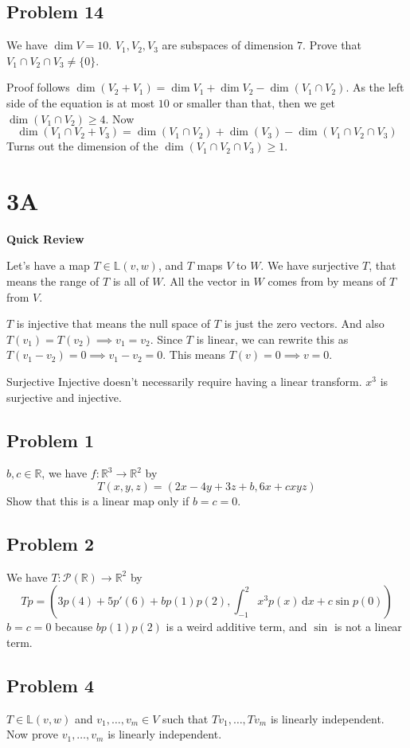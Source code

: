 \documentclass[letter]{article}
\begin{document}
\subsection{Problem 14} 
We have $\dim V = 10$. $V_1,V_2, V_3$ are subspaces of dimension $ 7$. Prove that $V_1 \cap V_2 \cap  V_3 \neq \{0\} $.

Proof follows $\dim(V_2 + V_1) = \dim V_1 + \dim V_2 - \dim(V_1 \cap  V_2)$. As the left side of the equation is at most $10$ or smaller than that, then we get $\dim (V_1 \cap V_2) \ge 4$. Now
\[
\dim (V_1 \cap  V_2 + V_3) = \dim(V_1 \cap  V_2) + \dim (V_3) - \dim(V_1 \cap  V_2 \cap V_3)
\] 
Turns out the dimension of the $\dim(V_1 \cap  V_2 \cap  V_3) \ge 1$.

\section{3A} 

\textbf{Quick Review}

Let's have a map $T \in  \mathbb{L}(v,w)$, and $T$ maps $V$ to $W$. We have surjective $T$, that means the range of $T$ is all of $W$. All the vector in $W$ comes from by means of $T$ from $V$. 

$T$ is injective that means the null space of $T$ is just the zero vectors. And also $T(v_1) = T(v_2) \implies v_1 = v_2$. Since $T$ is linear, we can rewrite this as $T(v_1 - v_2) = 0 \implies v_1 - v_2 = 0$. This means $T(v) = 0 \implies v = 0$. 

Surjective Injective doesn't necessarily require having a linear transform. $x^3$ is surjective and injective.

\subsection{Problem 1}
$b,c \in \mathbb{R}$, we have $f:\mathbb{R}^{3} \to \mathbb{R}^2$ by 
\[
T(x,y,z) = (2x-4y+3z+b,6x+cxyz)
\]
Show that this is a linear map only if $b=c=0$.

\subsection{Problem 2}
We have $T: \mathcal{P}(\mathbb{R})\to \mathbb{R}^2$  by 
\[
	Tp = \left(3p(4)+5p'(6)+bp(1)p(2), \int_{-1}^{2} x^3 p(x) \, \mathrm{d} x + c \sin p(0)\right)
\]
$b=c=0$ because $bp(1)p(2)$ is a weird additive term, and $\sin $ is not a linear term. 

\subsection{Problem 4} 
$T \in \mathbb{L}(v,w)$ and $v_1, \ldots, v_m \in V$ such that $Tv_1, \ldots, Tv_m$ is linearly independent. Now prove $v_1, \ldots, v_m $ is linearly independent.
\end{document}
